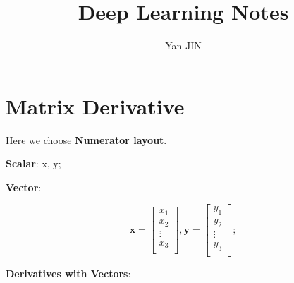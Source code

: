 \documentclass[12pt]{article}
\numberwithin{equation}{section}
\begin{document}
\small
\title{Deep Learning\cite{Goodfellow-et-al-2016-Book} Notes}
\author{Yan JIN}
\pagestyle{fancy}\fancyhf{}
\lhead{}
\lfoot{\textit{}}\cfoot{}\rfoot{\thepage}
\renewcommand{\headrulewidth}{1.pt}
\renewcommand{\footrulewidth}{1.pt}
\maketitle
\tableofcontents
\section{Matrix Derivative} \par
Here we choose \textbf{Numerator layout}. \par
\textbf{Scalar}: x, y; \par
\textbf{Vector}:\par
\begin{equation}
	\mathbf{x} = 
	\begin{bmatrix}
		x_1\\ x_2\\ \vdots\\ x_3\\
	\end{bmatrix}, 
	\mathbf{y} = 
	\begin{bmatrix}
		y_1\\ y_2\\ \vdots\\ y_3\\
	\end{bmatrix};	
\end{equation}\par
\textbf{Derivatives with Vectors}:
\end{document}
